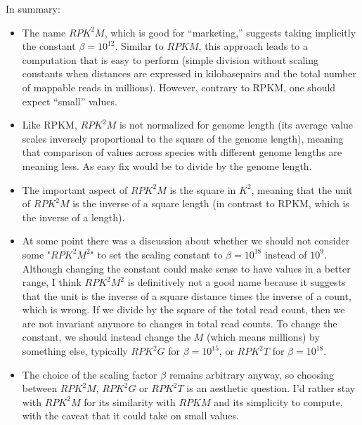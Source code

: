 \documentclass{article}
\begin{document}
In summary:
\begin{itemize}
\item The name $RPK^2M$, which is good for ``marketing,'' suggests
  taking implicitly the constant $\beta=10^{12}$. Similar to $RPKM$,
  this approach leads to a computation that is easy to perform (simple
  division without scaling constants when distances are expressed in
  kilobasepairs and the total number of mappable reads in
  millions). However, contrary to RPKM, one should expect ``small''
  values.
\item Like RPKM, $RPK^2M$ is not normalized for genome length (its
  average value scales inversely proportional to the square of the
  genome length), meaning that comparison of values across species
  with different genome lengths are meaning less. As easy fix would be
  to divide by the genome length.
\item The important aspect of $RPK^2M$ is the square in $K^2$, meaning
  that the unit of $RPK^2M$ is the inverse of a square length (in
  contrast to RPKM, which is the inverse of a length).
\item At some point there was a discussion about whether we should not
  consider some "$RPK^2M^2$" to set the scaling constant to
  $\beta=10^{18}$ instead of $10^9$.  Although changing the constant
  could make sense to have values in a better range, I think
  $RPK^2M^2$ is definitively not a good name because it suggests that
  the unit is the inverse of a square distance times the inverse of a
  count, which is wrong. If we divide by the square of the total read
  count, then we are not invariant anymore to changes in total read
  counts. To change the constant, we should instead change the $M$
  (which means millions) by something else, typically $RPK^2G$ for
  $\beta=10^{15}$, or $RPK^2T$ for $\beta=10^{18}$.
\item The choice of the scaling factor $\beta$ remains arbitrary
  anyway, so choosing between $RPK^2M$, $RPK^2G$ or $RPK^2T$ is an
  aesthetic question. I'd rather stay with $RPK^2M$ for its similarity
  with $RPKM$ and its simplicity to compute, with the caveat that it
  could take on small values.
\end{itemize}
\end{document}
